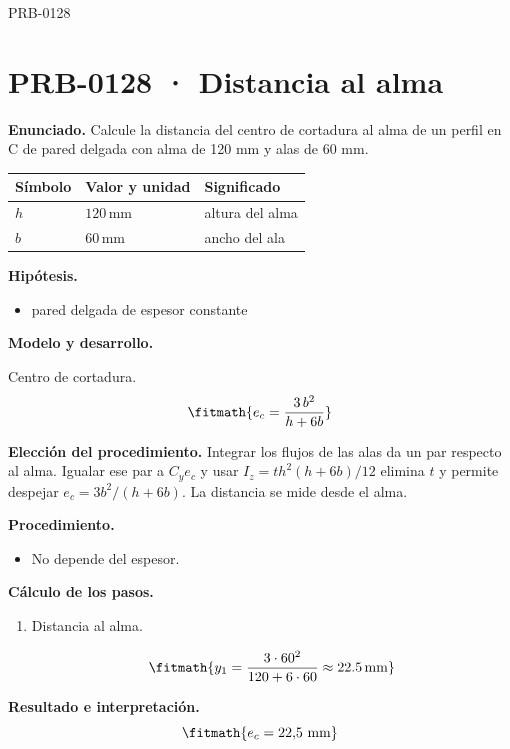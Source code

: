 \begin{studiumworked}{PRB-0128}

\section{PRB-0128 · Distancia al alma}

\textbf{Enunciado.} Calcule la distancia del centro de cortadura al alma de un perfil en C de pared delgada con alma de 120 mm y alas de 60 mm.

\par\medskip\noindent\begin{tabular}{@{}p{.18\linewidth}p{.26\linewidth}p{.48\linewidth}@{}}
\toprule Símbolo & Valor y unidad & Significado\\\midrule
$h$ & $120\,\mathrm{mm}$ & altura del alma\\
$b$ & $60\,\mathrm{mm}$ & ancho del ala\\
\bottomrule\end{tabular}\par\medskip

\textbf{Hipótesis.}\begin{itemize}\item pared delgada de espesor constante\end{itemize}

\textbf{Modelo y desarrollo.}

Centro de cortadura.\[\fitmath{e_c = \frac{3\,b^{2}}{h + 6b}}\]

\textbf{Elección del procedimiento.} Integrar los flujos de las alas da un par respecto al alma. Igualar ese par a $C_y e_c$ y usar $I_z=th^2(h+6b)/12$ elimina $t$ y permite despejar $e_c=3b^2/(h+6b)$. La distancia se mide desde el alma.

\textbf{Procedimiento.}\begin{itemize}\item No depende del espesor.\end{itemize}

\textbf{Cálculo de los pasos.}

\begin{enumerate}

\item Distancia al alma.

\[\fitmath{y_{1}=\frac{3\cdot {60}^{2}}{120+6\cdot 60}\approx 22.5\,\mathrm{mm}}\]

\end{enumerate}

\textbf{Resultado e interpretación.}\[\fitmath{e_c = 22{,}5\ \mathrm{mm}}\]


\end{studiumworked}
